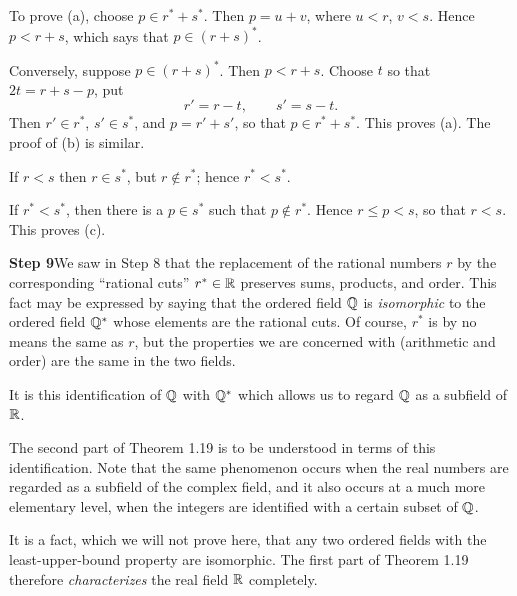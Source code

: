 To prove (a), choose $p \in r^*+s^*$. Then $p = u+v$, where $u<r$, $v<s$. Hence
$p < r+s$, which says that $p \in (r+s)^*$.

Conversely, suppose $p \in (r+s)^*$. Then $p < r+s$. Choose $t$ so that
$2t = r+s-p$, put
\[ r' = r-t, \qquad s' = s-t. \]
Then $r' \in r^*$, $s' \in s^*$, and $p = r'+s'$, so that $p \in
r^*+s^*$. This proves (a).
The proof of (b) is similar.

If $r < s$ then $r \in s^*$, but $r \notin r^*$; hence $r^* < s^*$.

If $r^* < s^*$, then there is a $p \in s^*$ such that $p \notin r^*$. Hence
$r \le p < s$, so that $r < s$. This proves (c).

\medskip
\noindent\textbf{Step 9}\quad We saw in Step 8 that the replacement of the
rational numbers $r$ by the corresponding ``rational cuts'' $r^* \in \mathbb{R}$
preserves sums, products, and order. This fact may be expressed by saying that
the ordered field $\mathbb{Q}$ is \emph{isomorphic} to the ordered field $\mathbb{Q}^*$ whose
elements are the rational cuts. Of course, $r^*$ is by no means the same as $r$,
but the properties we are concerned with (arithmetic and order) are the same in
the two fields.

It is this identification of $\mathbb{Q}$ with $\mathbb{Q}^*$ which allows us to regard $\mathbb{Q}$ as
a subfield of $\mathbb{R}$.

The second part of Theorem 1.19 is to be understood in terms of this
identification. Note that the same phenomenon occurs when the real numbers are
regarded as a subfield of the complex field, and it also occurs at a much more
elementary level, when the integers are identified with a certain subset of
$\mathbb{Q}$.

It is a fact, which we will not prove here, that any two ordered fields with the
least-upper-bound property are isomorphic. The first part of Theorem 1.19
therefore \emph{characterizes} the real field $\mathbb{R}$ completely.

